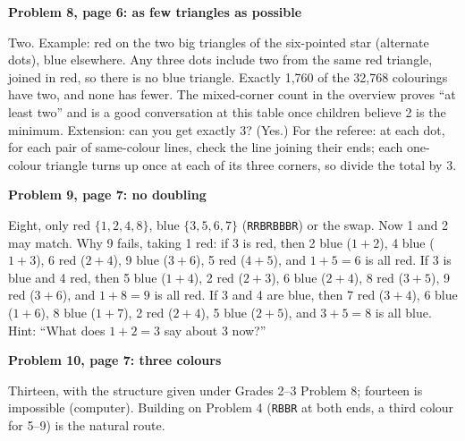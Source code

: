 \documentclass[11pt]{article}
\newcommand{\sub}[1]{\par\needspace{4\baselineskip}\textbf{#1}\par}
\newcommand{\st}[1]{\texttt{#1}}
\begin{document}
\begin{minipage}[t]{.70\linewidth}
\sub{Problem 8, page 6: as few triangles as possible}
Two. Example: red on the two big triangles of the six-pointed star (alternate dots), blue elsewhere. Any three dots include two from the same red triangle, joined in red, so there is no blue triangle. Exactly 1,760 of the 32,768 colourings have two, and none has fewer. The mixed-corner count in the overview proves ``at least two'' and is a good conversation at this table once children believe 2 is the minimum. Extension: can you get exactly 3? (Yes.) For the referee: at each dot, for each pair of same-colour lines, check the line joining their ends; each one-colour triangle turns up once at each of its three corners, so divide the total by 3.
\end{minipage}\hfill
\begin{minipage}[t]{.26\linewidth}\vspace{4pt}\centering\sixfig\end{minipage}\par\smallskip

\sub{Problem 9, page 7: no doubling}
Eight, only red $\{1,2,4,8\}$, blue $\{3,5,6,7\}$ (\st{RRBRBBBR}) or the swap. Now 1 and 2 may match. Why 9 fails, taking 1 red: if 3 is red, then 2 blue ($1+2$), 4 blue ($1+3$), 6 red ($2+4$), 9 blue ($3+6$), 5 red ($4+5$), and $1+5=6$ is all red. If 3 is blue and 4 red, then 5 blue ($1+4$), 2 red ($2+3$), 6 blue ($2+4$), 8 red ($3+5$), 9 red ($3+6$), and $1+8=9$ is all red. If 3 and 4 are blue, then 7 red ($3+4$), 6 blue ($1+6$), 8 blue ($1+7$), 2 red ($2+4$), 5 blue ($2+5$), and $3+5=8$ is all blue. Hint: ``What does $1+2=3$ say about 3 now?''

\sub{Problem 10, page 7: three colours}
Thirteen, with the structure given under Grades 2--3 Problem 8; fourteen is impossible (computer). Building on Problem 4 (\st{RBBR} at both ends, a third colour for 5--9) is the natural route.
\end{document}
